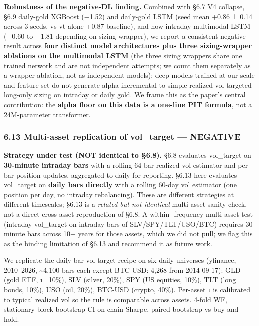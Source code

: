 \documentclass[
]{article}
\begin{document}
\textbf{Robustness of the negative-DL finding.} Combined with §6.7 V4
collapse, §6.9 daily-gold XGBoost (−1.52) and daily-gold LSTM (seed mean
+0.86 ± 0.14 across 3 seeds, vs vt-alone +0.87 baseline), and now
intraday multimodal LSTM (−0.60 to +1.81 depending on sizing wrapper),
we report a consistent negative result across \textbf{four distinct
model architectures plus three sizing-wrapper ablations on the
multimodal LSTM} (the three sizing wrappers share one trained network
and are not independent attempts; we count them separately as a wrapper
ablation, not as independent models): deep models trained at our scale
and feature set do not generate alpha incremental to simple
realized-vol-targeted long-only sizing on intraday or daily gold. We
frame this as the paper's central contribution: the \textbf{alpha floor
on this data is a one-line PIT formula}, not a 24M-parameter
transformer.

\subsubsection{6.13 Multi-asset replication of vol\_target ---
NEGATIVE}\label{multi-asset-replication-of-vol_target-negative}

\textbf{Strategy under test (NOT identical to §6.8).} §6.8 evaluates
vol\_target on \textbf{30-minute intraday bars} with a rolling 64-bar
realized-vol estimator and per-bar position updates, aggregated to daily
for reporting. §6.13 here evaluates vol\_target on \textbf{daily bars
directly} with a rolling 60-day vol estimator (one position per day, no
intraday rebalancing). These are different strategies at different
timescales; §6.13 is a \emph{related-but-not-identical} multi-asset
sanity check, not a direct cross-asset reproduction of §6.8. A within-
frequency multi-asset test (intraday vol\_target on intraday bars of
SLV/SPY/TLT/USO/BTC) requires 30-minute bars across 10+ years for those
assets, which we did not pull; we flag this as the binding limitation of
§6.13 and recommend it as future work.

We replicate the daily-bar vol-target recipe on six daily universes
(yfinance, 2010--2026, \textasciitilde4,100 bars each except BTC-USD:
4,268 from 2014-09-17): GLD (gold ETF, τ=10\%), SLV (silver, 20\%), SPY
(US equities, 10\%), TLT (long bonds, 10\%), USO (oil, 20\%), BTC-USD
(crypto, 40\%). Per-asset τ is calibrated to typical realized vol so the
rule is comparable across assets. 4-fold WF, stationary block bootstrap
CI on chain Sharpe, paired bootstrap vs buy-and-hold.
\end{document}
